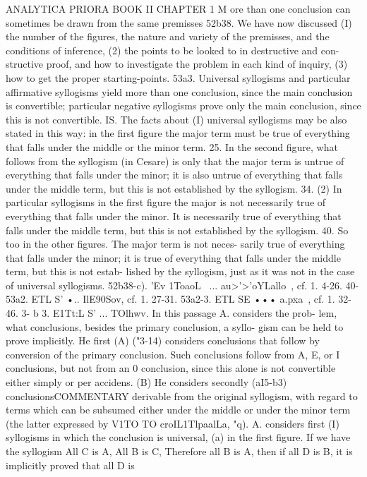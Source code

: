 ANALYTICA PRIORA
BOOK II
CHAPTER 1
M ore than one conclusion can sometimes be drawn from the same
premisses
52b38. We have now discussed (I) the number of the figures,
the nature and variety of the premisses, and the conditions of
inference, (2) the points to be looked to in destructive and con-
structive proof, and how to investigate the problem in each kind
of inquiry, (3) how to get the proper starting-points.
53a3. Universal syllogisms and particular affirmative syllogisms
yield more than one conclusion, since the main conclusion is
convertible; particular negative syllogisms prove only the main
conclusion, since this is not convertible.
IS. The facts about (I) universal syllogisms may be also stated
in this way: in the first figure the major term must be true of
everything that falls under the middle or the minor term.
25. In the second figure, what follows from the syllogism (in
Cesare) is only that the major term is untrue of everything that
falls under the minor; it is also untrue of everything that falls
under the middle term, but this is not established by the syllogism.
34. (2) In particular syllogisms in the first figure the major is
not necessarily true of everything that falls under the minor. It
is necessarily true of everything that falls under the middle term,
but this is not established by the syllogism.
40. So too in the other figures. The major term is not neces-
sarily true of everything that falls under the minor; it is true of
everything that falls under the middle term, but this is not estab-
lished by the syllogism, just as it was not in the case of universal
syllogisms.
52b38-c). 'Ev 1ToaoL~ ... au>'>'oYLallo~, cf. 1. 4-26.
40-53a2. ETL S' •.. IlE90Sov, cf. 1. 27-31.
53a2-3. ETL SE ••• a.pxa~, cf. 1. 32-46.
3- b 3. E1Tt:L S' ... TOlhwv. In this passage A. considers the prob-
lem, what conclusions, besides the primary conclusion, a syllo-
gism can be held to prove implicitly. He first (A) ("3-14) considers
conclusions that follow by conversion of the primary conclusion.
Such conclusions follow from A, E, or I conclusions, but not from
an 0 conclusion, since this alone is not convertible either simply
or per accidens. (B) He considers secondly (aI5-b3) conclusionsCOMMENTARY
derivable from the original syllogism, with regard to terms which
can be subsumed either under the middle or under the minor term
(the latter expressed by V1TO TO croIL1TlpaalLa, "q). A. considers first
(I) syllogisms in which the conclusion is universal, (a) in the first
figure. If we have the syllogism All C is A, All B is C, Therefore
all B is A, then if all D is B, it is implicitly proved that all D is
